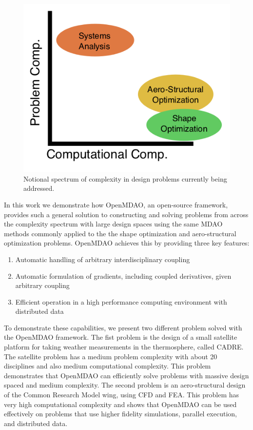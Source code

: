 \documentclass[]{aiaa-tc} %
\begin{document}
    \begin{figure}[!hbt]\begin{center}
      \includegraphics[width=.5\textwidth]{images/complexity_cartoon}
      \caption{ Notional spectrum of complexity in design problems currently being addressed. \label{fig:complexity_cartoon}}
    \end{center}\end{figure}

    In this work we demonstrate how OpenMDAO, an open-source framework, provides such a general
    solution to constructing and solving problems from across the complexity spectrum with large design spaces
    using the same MDAO methods commonly applied to the the shape optimization and aero-structural optimization
    problems. OpenMDAO achieves this by providing three key features:

    \begin{enumerate}
      \item Automatic handling of arbitrary interdisciplinary coupling
      \item Automatic formulation of gradients, including coupled derivatives, given arbitrary coupling
      \item Efficient operation in a high performance computing environment with distributed data
    \end{enumerate}

    To demonstrate these capabilities, we present two different problem solved with
    the OpenMDAO framework. The fist problem is the design of a small satellite
    platform for taking weather measurements in the thermosphere, called CADRE. The satellite problem has a
    medium problem complexity with about 20 disciplines and also medium computational complexity.
    This problem demonstrates that OpenMDAO can efficiently solve problems with massive design spaced and
    medium complexity. The second problem is an aero-structural design of
    the Common Research Model wing, using CFD and FEA. This problem has very high computational
    complexity and shows that OpenMDAO can be used effectively on problems that use higher fidelity
    simulations, parallel execution, and distributed data.
\end{document}
